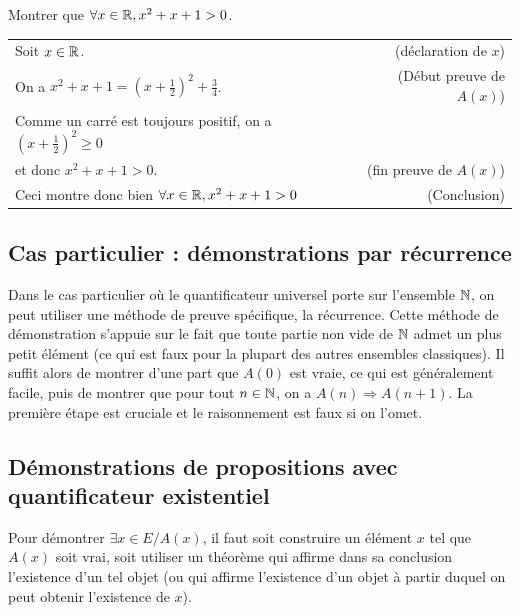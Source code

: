 \begin{exemple}
Montrer que $\forall x\in \mathbb{R}, x^2+x+1> 0$\fg.
\begin{red}
\begin{tabular}{lr}
Soit $x\in \mathbb{R}$. & (déclaration de $x$)\\
\hspace{1cm} On a $x^2+x+1 = (x+\frac12)^2+\frac34$. & (Début preuve de $A(x)$)\\
\hspace{1cm}Comme un carré est toujours positif, on a $(x+\frac12)^2 \geq 0$ & \\
\hspace{1cm} et donc  $x^2+x+1>0$. & (fin preuve de $A(x)$)\\
Ceci montre donc bien $\forall x\in \mathbb{R}, x^2+x+1>0$ & (Conclusion)\\
\end{tabular}
\end{red}
\end{exemple}


\subsection{Cas particulier : démonstrations par récurrence}

Dans le cas particulier où le quantificateur universel porte sur l'ensemble $\mathbb{N}$, on peut utiliser une méthode de preuve spécifique, la récurrence. Cette méthode de démonstration s'appuie sur le fait que toute partie non vide de $\mathbb{N}$ admet un plus petit élément (ce qui est faux pour la plupart des autres ensembles classiques). Il suffit alors de montrer d'une part que $A(0)$ est vraie, ce qui est généralement facile, puis de montrer que pour tout $n \in\mathbb{N}$, on a $A(n) \Rightarrow A(n+1)$. La première étape est cruciale et le raisonnement est faux si on l'omet.


\subsection{Démonstrations de propositions avec quantificateur existentiel}

Pour démontrer \og$\exists x\in E\slash A(x)$, il faut soit construire un élément $x$ tel que $A(x)$ soit vrai, soit utiliser un théorème qui affirme dans sa conclusion l'existence d'un tel objet (ou qui affirme l'existence d'un objet à partir duquel on peut obtenir l'existence de $x$).

